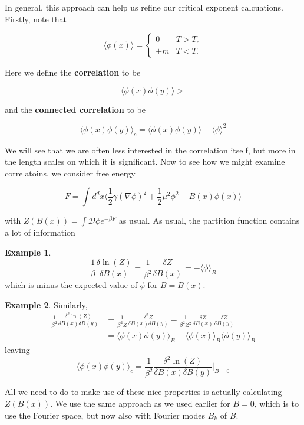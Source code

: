 \documentclass{article}
\theoremstyle{definition}
\newtheorem{example}{Example}
\begin{document}
In general, this approach can help us refine our critical exponent calcuations.
Firstly, note that

$$ \langle \phi(x) \rangle =
\begin{cases}
  0 & T > T_c \\
  \pm m & T < T_c
\end{cases}
$$

Here we define the \textbf{correlation} to be

$$ \langle \phi(x) \phi(y) \rangle> $$

and the \textbf{connected correlation} to be

$$ \langle \phi(x) \phi(y) \rangle_c = \langle \phi(x) \phi(y) \rangle - \langle
\phi \rangle^2 $$

We will see that we are often less interested in the correlation itself, but
more in the length scales on which it is significant. Now to see how we might
examine correlatoins, we consider free energy

$$ F = \int d^d x \langle \frac{1}{2} \gamma (\nabla \phi)^2 + \frac{1}{2} \mu^2
\phi^2 - B(x) \phi(x) \rangle $$

with $Z(B(x)) = \int \mathcal{D}\phi e^{-\beta F}$ as usual. As usual, the
partition function contains a lot of information

\begin{example}
  $$ \frac{1}{\beta} \frac{\delta \ln(Z)}{\delta B(x)} = \frac{1}{\beta^2}
  \frac{\delta Z}{\delta B(x)} = - \langle \phi \rangle_B $$
  which is minus the expected value of $\phi$ for $B = B(x)$.
\end{example}

\begin{example}
  Similarly,
  \begin{align*}
    \frac{1}{\beta^2} \frac{\delta^2 \ln(Z)}{\delta B(x) \delta B(y)}
    &= \frac{1}{\beta^2 Z} \frac{\delta^2 Z}{\delta B(x) \delta B(y)} - \frac{1}{\beta^2 Z^2} \frac{\delta Z}{\delta B(x)} \frac{\delta Z}{\delta B(y)} \\
    &= \langle \phi(x) \phi(y) \rangle_B - \langle \phi(x) \rangle_B \langle \phi(y) \rangle_B
  \end{align*}
  leaving
  $$ \langle \phi(x) \phi(y) \rangle_c = \frac{1}{\beta^2} \frac{\delta^2
    \ln(Z)}{\delta B(x) \delta B(y)} |_{B=0} $$
\end{example}

All we need to do to make use of these nice properties is actually calculating
$Z(B(x))$. We use the same approach as we used earlier for $B = 0$, which is to
use the Fourier space, but now also with Fourier modes $B_k$ of $B$.
\end{document}
